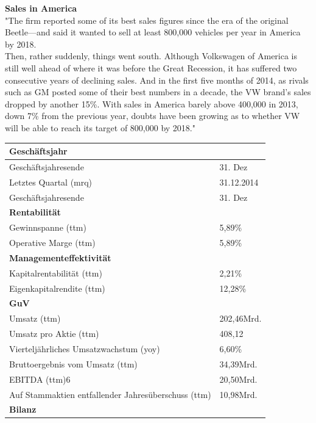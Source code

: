 \documentclass[12pt]{article}
\begin{document}
\textbf{Sales in America} \\
"The firm reported some of its best sales figures since the era of the original Beetle—and said it wanted to sell at least 800,000 vehicles per year in America by 2018.\\
Then, rather suddenly, things went south. Although Volkswagen of America is still well ahead of where it was before the Great Recession, it has suffered two consecutive years of declining sales. And in the first five months of 2014, as rivals such as GM posted some of their best numbers in a decade, the VW brand’s sales dropped by another 15\%. With sales in America barely above 400,000 in 2013, down 7\% from the previous year, doubts have been growing as to whether VW will be able to reach its target of 800,000 by 2018." \cite{ec1}

\begin{table}[h]
\begin{tabular}{|p{}|p{}|}
\hline
\textbf{Geschäftsjahr}  & \\  \hline
Geschäftsjahresende &   31. Dez \\  
Letztes Quartal (mrq) &   31.12.2014 \\  
Geschäftsjahresende &   31. Dez \\  \hline
\textbf{Rentabilität}  & \\  \hline
 Gewinnspanne (ttm)&   5,89\% \\  
 Operative Marge (ttm)&	5,89\%    \\ \hline
 \textbf{Managementeffektivität}  & \\  \hline
Kapitalrentabilität (ttm) & 2,21\%  \\  
Eigenkapitalrendite (ttm) &   12,28\%  \\  \hline
 \textbf{GuV}  & \\  \hline

 Umsatz (ttm)&   202,46Mrd. \\  
 Umsatz pro Aktie (ttm)&  408,12  \\  
 
Vierteljährliches Umsatzwachstum (yoy)&   6,60\% \\  
 Bruttoergebnis vom Umsatz (ttm)&34,39Mrd.    \\  
EBITDA (ttm)6 &  20,50Mrd.  \\  
 Auf Stammaktien entfallender Jahresüberschuss (ttm) &  10,98Mrd.  \\  \hline
  \textbf{Bilanz}  & \\  \hline



\end{tabular}
\end{table}
\end{document}
